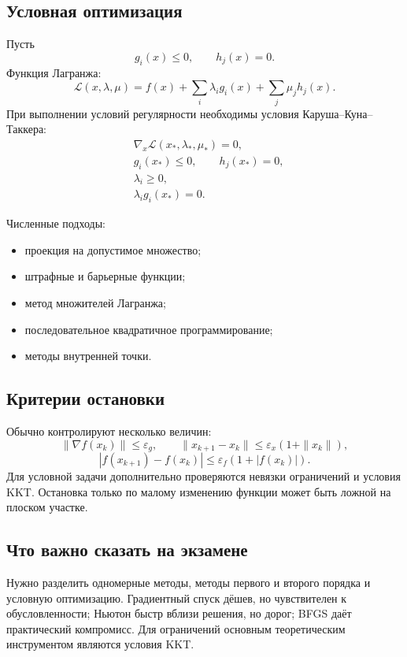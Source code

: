 \subsection{Условная оптимизация}

Пусть
\[
    g_i(x)\leq0,
    \qquad
    h_j(x)=0.
\]
Функция Лагранжа:
\[
    \mathcal L(x,\lambda,\mu)
    =f(x)+\sum_i\lambda_i g_i(x)+\sum_j\mu_j h_j(x).
\]
При выполнении условий регулярности необходимы условия Каруша--Куна--Таккера:
\[
\begin{aligned}
&\nabla_x\mathcal L(x_*,\lambda_*,\mu_*)=0,\\
&g_i(x_*)\leq0,\qquad h_j(x_*)=0,\\
&\lambda_i\geq0,\\
&\lambda_i g_i(x_*)=0.
\end{aligned}
\]

Численные подходы:
\begin{itemize}
    \item проекция на допустимое множество;
    \item штрафные и барьерные функции;
    \item метод множителей Лагранжа;
    \item последовательное квадратичное программирование;
    \item методы внутренней точки.
\end{itemize}

\subsection{Критерии остановки}

Обычно контролируют несколько величин:
\[
    \|\nabla f(x_k)\|\leq\varepsilon_g,
    \qquad
    \|x_{k+1}-x_k\|\leq\varepsilon_x(1+\|x_k\|),
\]
\[
    |f(x_{k+1})-f(x_k)|\leq\varepsilon_f(1+|f(x_k)|).
\]
Для условной задачи дополнительно проверяются невязки ограничений и условия KKT.
Остановка только по малому изменению функции может быть ложной на плоском участке.

\subsection{Что важно сказать на экзамене}

Нужно разделить одномерные методы, методы первого и второго порядка и условную
оптимизацию. Градиентный спуск дёшев, но чувствителен к обусловленности; Ньютон
быстр вблизи решения, но дорог; BFGS даёт практический компромисс. Для ограничений
основным теоретическим инструментом являются условия KKT.

\newpage